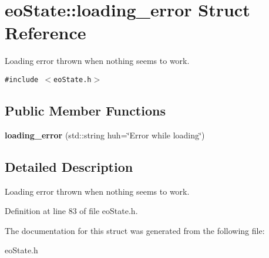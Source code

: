 \section{eo\-State::loading\_\-error Struct Reference}
\label{structeo_state_1_1loading__error}
Loading error thrown when nothing seems to work.  


{\tt \#include $<$eo\-State.h$>$}

\subsection*{Public Member Functions}
\begin{CompactItemize}
\item 
{\bf loading\_\-error} (std::string huh=\char`\"{}Error while loading\char`\"{})\label{structeo_state_1_1loading__error_a0}

\end{CompactItemize}


\subsection{Detailed Description}
Loading error thrown when nothing seems to work. 



Definition at line 83 of file eo\-State.h.

The documentation for this struct was generated from the following file:\begin{CompactItemize}
\item 
eo\-State.h\end{CompactItemize}
